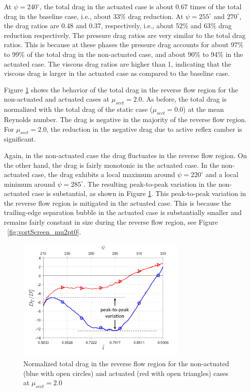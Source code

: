 At $\psi=240^\circ$, the total drag in the actuated case is about 0.67 times of the total drag in the baseline case, i.e., about 33\% drag reduction. At $\psi=255^\circ$ and $270^\circ$, the drag ratios are 0.48 and 0.37, respectively, i.e., about 52\% and 63\% drag reduction respectively.
The pressure drag ratios are very similar to the total drag ratios.
This is because at these phases the pressure drag accounts for about 97\% to 99\% of the total drag in the non-actuated case, and about 90\% to 94\% in the actuated case.
The viscous drag ratios are higher than 1, indicating that the viscous drag is larger in the actuated case as compared to the baseline case. 




Figure \ref{fig:total_drag_zoomed_mu_2pt0} shows the behavior of the total drag in the reverse flow region for the non-actuated and actuated cases at $\mu_{sect}=2.0$. As before, the total drag is normalized with the total drag of the static case ($\mu_{sect}=0.0$) at the mean Reynolds number. 
The drag is negative in the majority of the reverse flow region.
For $\mu_{sect}=2.0$, the reduction in the negative drag due to active reflex camber is significant.

Again, in the non-actuated case the drag fluctuates in the reverse flow region.
On the other hand, the drag is fairly monotonic in the actuated case.
In the non-actuated case, the drag exhibits a local maximum around $\psi=220^\circ$ and a local minimum around $\psi=285^\circ$.
The resulting peak-to-peak variation in the non-actuated case is substantial, as shown in Figure \ref{fig:total_drag_zoomed_mu_2pt0}.
This peak-to-peak variation in the reverse flow region is mitigated in the actuated case.
This is because the trailing-edge separation bubble in the actuated case is substantially smaller and remains fairly constant in size during the reverse flow region, see Figure ~\ref{fig:vortScreen_mu2pt0}.

\begin{figure}[H]
	
	\centering
	\includegraphics[width=0.75\textwidth]{figures/Zoomed_Drag_tot_NACA0012_Re1m_aoa10_3.png}
	\caption{Normalized total drag in the reverse flow region for the non-actuated (blue with open circles) and actuated (red with open triangles) cases at $\mu_{sect}=2.0$}
	\label{fig:total_drag_zoomed_mu_2pt0}
\end{figure}

